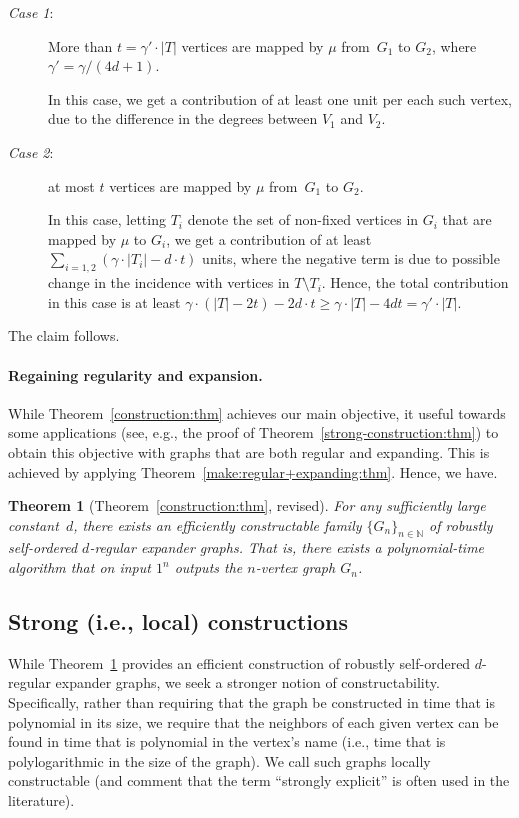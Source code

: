 \documentclass[10pt,a4paper]{article}
\newtheorem{theorem}{Theorem}[section]
\theoremstyle{definition}
\newcommand{\N}{\mathbb N}
\newcommand{\BT}{\begin{theorem}}   \newcommand{\ET}{\end{theorem}}
\newcommand{\BDes}{\begin{description}}
\newcommand{\EDes}{\end{description}}
\begin{document}
\BDes
\item[{\em Case 1}:] More than $t=\gamma'\cdot|T|$ vertices are
mapped by $\mu$ from~$G_1$ to $G_2$, where $\gamma'=\gamma/(4d+1)$.

In this case,
we get a contribution of at least one unit per each such vertex,
due to the difference in the degrees between $V_1$ and $V_2$.

\item[{\em Case 2}:] at most $t$ vertices are
mapped by $\mu$ from~$G_1$ to $G_2$.

In this case, letting $T_i$ denote the set of non-fixed
vertices in $G_i$ that are mapped by $\mu$ to $G_i$,
we get a contribution of
at least $\sum_{i=1,2}(\gamma\cdot|T_i|-d\cdot t)$ units,
where the negative term is due to possible change in the incidence
with vertices in $T\setminus T_i$.
Hence, the total contribution in this case is at least
$\gamma\cdot(|T|-2t)-2d\cdot t \geq \gamma\cdot|T|-4dt= \gamma'\cdot|T|$.
%
%
%
\EDes
The claim follows.
\EPFS




\paragraph{Regaining regularity and expansion.}
While Theorem~\ref{construction:thm} achieves our main objective,
it useful towards some applications
(see, e.g., the proof of Theorem~\ref{strong-construction:thm})
to obtain this objective with graphs that are both regular and expanding.
This is achieved by applying Theorem~\ref{make:regular+expanding:thm}.
Hence, we have.

\BT[Theorem~\ref{construction:thm}, revised]
\label{construction-add:thm}
For any sufficiently large constant~$d$,
there exists an efficiently constructable family $\{G_n\}_{n\in\N}$
of robustly self-ordered $d$-regular expander graphs.
That is, there exists a polynomial-time algorithm
that on input $1^n$ outputs the $n$-vertex graph $G_n$.
\ET

\subsection{Strong (i.e., local) constructions}
\label{step3:sec}
%
While Theorem~\ref{construction-add:thm} provides
an efficient construction of
robustly self-ordered $d$-regular expander graphs,
we seek a stronger notion of constructability.
Specifically, rather than requiring that the graph be constructed
in time that is polynomial in its size, we require that the neighbors
of each given vertex can be found in time that is polynomial
in the vertex's name
(i.e., time that is polylogarithmic in the size of the graph).
We call such graphs {\sf locally constructable}
(and comment that the term ``strongly explicit''
is often used in the literature).
\end{document}
